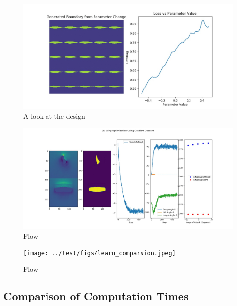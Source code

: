\documentclass{article} %
\begin{document}
\begin{figure}[h]
\begin{center}
\includegraphics[scale=0.30]{../test/figs/boundary_space_explore.jpeg}
\end{center}
\caption{A look at the design }
\end{figure}

\begin{figure}[h]
\begin{center}
\includegraphics[scale=0.30]{../test/figs/learn_gradient_descent.jpeg}
\end{center}
\caption{Flow}
\end{figure}

\begin{figure}[h]
\begin{center}
\texttt{[image: ../test/figs/learn\_comparsion.jpeg]}
\end{center}
\caption{Flow}
\end{figure}

\subsection{Comparison of Computation Times}
\end{document}

